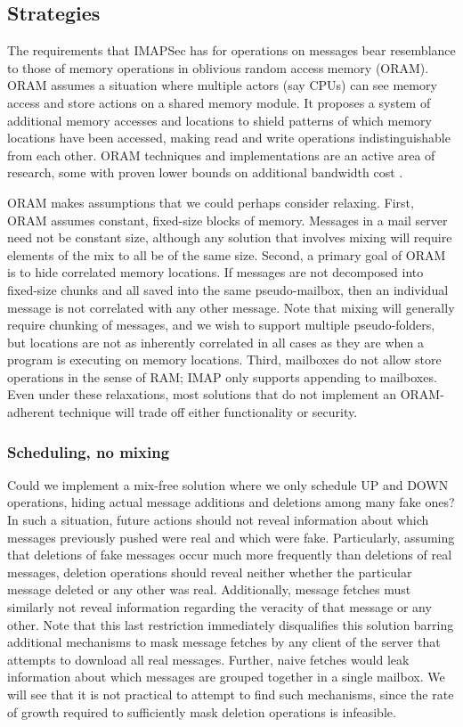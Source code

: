 \documentclass[pageno]{jpaper}
\newcommand{\project}{IMAPSec }
\begin{document}
\label{best-metadata}
\subsection{Strategies}

The requirements that \project has for operations on messages bear resemblance to those of memory operations in oblivious random access memory (ORAM)\cite{oram}. ORAM assumes a situation where multiple actors (say CPUs) can see memory access and store actions on a shared memory module. It proposes a system of additional memory accesses and locations to shield patterns of which memory locations have been accessed, making read and write operations indistinguishable from each other. ORAM techniques and implementations are an active area of research, some with proven lower bounds on additional bandwidth cost \cite{stefanov2013path}.

ORAM makes assumptions that we could perhaps consider relaxing. First, ORAM assumes constant, fixed-size blocks of memory. Messages in a mail server need not be constant size, although any solution that involves mixing will require elements of the mix to all be of the same size. Second, a primary goal of ORAM is to hide correlated memory locations. If messages are not decomposed into fixed-size chunks and all saved into the same pseudo-mailbox, then an individual message is not correlated with any other message. Note that mixing will generally require chunking of messages, and we wish to support multiple pseudo-folders, but locations are not as inherently correlated in all cases as they are when a program is executing on memory locations. Third, mailboxes do not allow store operations in the sense of RAM; IMAP only supports appending to mailboxes. Even under these relaxations, most solutions that do not implement an ORAM-adherent technique will trade off either functionality or security.


\subsubsection{Scheduling, no mixing}
Could we implement a mix-free solution where we only schedule UP and DOWN operations, hiding actual message additions and deletions among many fake ones? In such a situation, future actions should not reveal information about which messages previously pushed were real and which were fake. Particularly, assuming that deletions of fake messages occur much more frequently than deletions of real messages, deletion operations should reveal neither whether the particular message deleted or any other was real. Additionally, message fetches must similarly not reveal information regarding the veracity of that message or any other. Note that this last restriction immediately disqualifies this solution barring additional mechanisms to mask message fetches by any client of the server that attempts to download all real messages. Further, naive fetches would leak information about which messages are grouped together in a single mailbox. We will see that it is not practical to attempt to find such mechanisms, since the rate of growth required to sufficiently mask deletion operations is infeasible.
\end{document}

